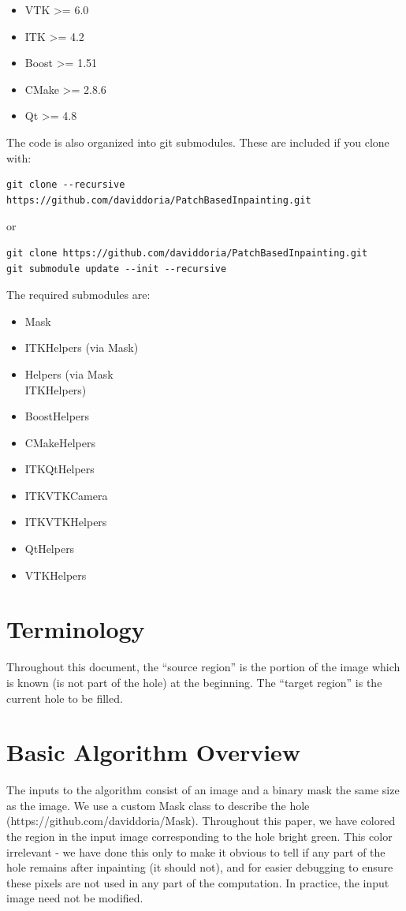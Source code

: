 \documentclass{InsightArticle}
\begin{document}
\begin{itemize}
 \item VTK >= 6.0
 \item ITK >= 4.2
 \item Boost >= 1.51
 \item CMake >= 2.8.6
 \item Qt >= 4.8
\end{itemize}

The code is also organized into git submodules. These are included if you clone with:
\begin{verbatim}
git clone --recursive https://github.com/daviddoria/PatchBasedInpainting.git 
\end{verbatim}

or 

\begin{verbatim}
git clone https://github.com/daviddoria/PatchBasedInpainting.git
git submodule update --init --recursive
\end{verbatim}

The required submodules are:

\begin{itemize}
 \item Mask
 \item ITKHelpers (via Mask)
 \item Helpers (via Mask\\ITKHelpers)
 \item BoostHelpers
 \item CMakeHelpers
 \item ITKQtHelpers
 \item ITKVTKCamera
 \item ITKVTKHelpers
 \item QtHelpers
 \item VTKHelpers
\end{itemize}

\section{Terminology}
Throughout this document, the ``source region'' is the portion of the image which is known (is not part of the hole) at the beginning. The ``target region'' is the current hole to be filled.

\section{Basic Algorithm Overview}
The inputs to the algorithm consist of an image and a binary mask the same size as the image. We use a custom Mask class to describe the hole (https://github.com/daviddoria/Mask). Throughout this paper, we have colored the region in the input image corresponding to the hole bright green. This color irrelevant - we have done this only to make it obvious to tell if any part of the hole remains after inpainting (it should not), and for easier debugging to ensure these pixels are not used in any part of the computation. In practice, the input image need not be modified.
\end{document}
